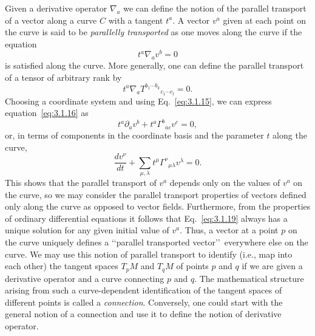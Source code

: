 Given a derivative operator $\nabla_a$ we can define the notion of the parallel transport
of a vector along a curve $C$ with a tangent $t^a$. A vector $v^a$ given at each point on the
curve is said to be \emph{parallelly transported} as one moves along the curve if the equation
\begin{equation}
  t^a\nabla_av^b=0
  \tag{3.1.16}\label{eq:3.1.16}
\end{equation}
is satisfied along the curve. More generally, one can define the parallel transport of
a tensor of arbitrary rank by
\begin{equation}
  t^a\nabla_aT^{b_1\cdots b_k}{}_{c_1\cdots c_l}=0.
  \tag{3.1.17}\label{eq:3.1.17}
\end{equation}
Choosing a coordinate system and using Eq.~\eqref{eq:3.1.15}, we can express equation~\eqref{eq:3.1.16} as
\begin{equation}
  t^a\partial_av^b+t^a\Gamma^b{}_{ac}v^c=0,
  \tag{3.1.18}\label{eq:3.1.18}
\end{equation}
or, in terms of components in the coordinate basis and the parameter $t$ along the
curve,
\begin{equation}
  \frac{dv^\nu}{dt}+\sum_{\mu,\lambda}t^\mu\Gamma^\nu{}_{\mu\lambda}v^\lambda=0.
  \tag{3.1.19}\label{eq:3.1.19}
\end{equation}
This shows that the parallel transport of $v^a$ depends only on the values of $v^a$ on the
curve, so we may consider the parallel transport properties of vectors defined only
along the curve as opposed to vector fields. Furthermore, from the properties of
ordinary differential equations it follows that Eq.~\eqref{eq:3.1.19} always has a unique
solution for any given initial value of $v^a$. Thus, a vector at a point $p$ on the curve
uniquely defines a \lq\lq parallel transported vector\rq\rq\ everywhere else on the curve. We
may use this notion of parallel transport to identify (i.e., map into each other) the
tangent spaces $T_pM$ and $T_qM$ of points $p$ and $q$ if we are given a derivative operator and
a curve connecting $p$ and $q$. The mathematical structure arising from such a curve-dependent identification of the tangent spaces of different points is called a \emph{connection}. Conversely, one could start with the general notion of a connection and use
it to define the notion of derivative operator.


